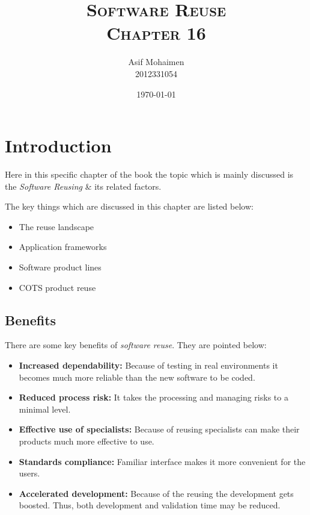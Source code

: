 \documentclass[dvips,12pt]{article}
\begin{document}
\cfoot{\thepage}

\title{
  \textsc{\textbf{Software Reuse}\\
  Chapter 16}
}
\author{
  Asif Mohaimen\\
  2012331054\\
}
\date{\today}

\maketitle


\section{Introduction} \label{introduction}
Here in this specific chapter of the book the topic which is mainly discussed is the \emph{Software Reusing} \& it\textquotesingle s related factors.

The key things which are discussed in this chapter are listed below:
\begin{itemize}
\item The reuse landscape 
\item Application frameworks
\item Software product lines
\item COTS product reuse
\end{itemize}

\subsection{Benefits}
There are some key benefits of \emph{software reuse}. They are pointed below:
\begin{itemize}
\item \textbf{Increased dependability:} Because of testing in real environments it becomes much more reliable than the new software to be coded.
\item \textbf{Reduced process risk:} It takes the processing and managing risks to a minimal level.
\item \textbf{Effective use of specialists:} Because of reusing specialists can make their products much more effective to use.
\item \textbf{Standards compliance:}  Familiar interface makes it more convenient for the users.
\item \textbf{Accelerated development:} Because of the reusing the development gets boosted. Thus, both development and validation time may be reduced.
\end{itemize}
\end{document}
